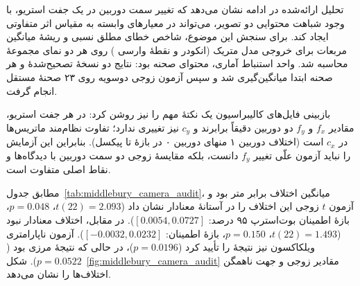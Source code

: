 تحلیل ارائه‌شده در ادامه نشان می‌دهد که تغییر سمت دوربین در یک جفت استریو، با وجود شباهت محتوایی دو تصویر، می‌تواند در معیارهای وابسته به مقیاس اثر متفاوتی ایجاد کند. برای سنجش این موضوع، شاخص خطای مطلق نسبی و ریشهٔ میانگین مربعات برای خروجی مدل متریک  (انکودر  و نقطهٔ وارسی ) روی هر دو نمای مجموعهٔ  محاسبه شد. واحد استنباط آماری، محتوای صحنه بود: نتایج دو نسخهٔ تصحیح‌شدهٔ  و  هر صحنه ابتدا میانگین‌گیری شد و سپس آزمون زوجی دوسویه روی ۲۳ صحنهٔ مستقل انجام گرفت.

بازبینی فایل‌های کالیبراسیون یک نکتهٔ مهم را نیز روشن کرد: در هر جفت استریو، مقادیر $f_x$ و $f_y$ دو دوربین دقیقاً برابرند و $c_y$ نیز تغییری ندارد؛ تفاوت نظام‌مند ماتریس‌ها در $c_x$ است (اختلاف دوربین ۱ منهای دوربین ۰ در بازهٔ  تا  پیکسل). بنابراین این آزمایش را نباید آزمون علّی تغییر $f_y$ دانست، بلکه مقایسهٔ زوجی دو سمت دوربین با دیدگاه‌ها و نقاط اصلی متفاوت است.

مطابق جدول~\ref{tab:middlebury_camera_audit}، میانگین اختلاف  برابر  متر بود و آزمون $t$ زوجی این اختلاف را در آستانهٔ  معنادار نشان داد ($t(22)=2.093$، $p=0.048$، بازهٔ اطمینان بوت‌استرپ ۹۵ درصد: $[0.0054,0.0727]$). در مقابل، اختلاف  معنادار نبود ($t(22)=1.493$، $p=0.150$، بازهٔ اطمینان: $[-0.0032,0.0232]$). آزمون ناپارامتری ویلکاکسون نیز نتیجهٔ  را تأیید کرد ($p=0.0196$)، در حالی که نتیجهٔ  مرزی بود ($p=0.0522$). شکل~\ref{fig:middlebury_camera_audit} مقادیر زوجی و جهت ناهمگن اختلاف‌ها را نشان می‌دهد.

\begin{table}[htbp]
\centering
\caption{ممیزی بازتولیدپذیر تفاوت دو سمت دوربین در . اختلاف به‌صورت دوربین ۰ منهای دوربین ۱ و بازه‌ها به‌صورت بوت‌استرپ زوجی ۹۵ درصد گزارش شده‌اند ($n=23$).}
\label{tab:middlebury_camera_audit}
\end{table}

